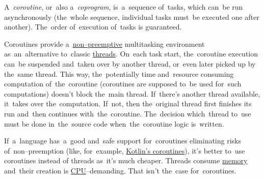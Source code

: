 \mbox{A \textit{coroutine}}, or~also \mbox{a \textit{coprogram},} is~a~sequence of~tasks, which can~be run asynchronously (the~whole sequence, individual tasks must~be executed one after another).
The~order of~execution of~tasks is guaranteed.

Coroutines provide a~\hyperref[preemption]{non--preemptive} multitasking environment as~an~alternative to~classic \hyperref[multithreading]{threads}.
On~each task start, the~coroutine execution can~be suspended and~taken over by another thread, or~even later picked up by the~same thread.
This way, the~potentially time and~resource consuming computation of~the~coroutine (coroutines are supposed to~be used for~such computations) doesn't block the~main thread.
If~there's another thread available, it~takes over the~computation.
If~not, then the~original thread first finishes its run and~then continues with~the~coroutine.
The~decision which~thread to~use must be done in~the~source code when~the~coroutine logic \mbox{is written.}

If~a~language has~a~good and~safe support for~coroutines eliminating risks of~non--preemption (like, for~example, \hyperref[kotlincoroutine]{Kotlin's coroutines}), it's better to~use coroutines instead of threads as~it's much cheaper.
Threads consume \hyperref[systemmemory]{memory} and~their creation is \hyperref[processorcpucore]{CPU}--demanding.
That isn't the~case for~coroutines.
